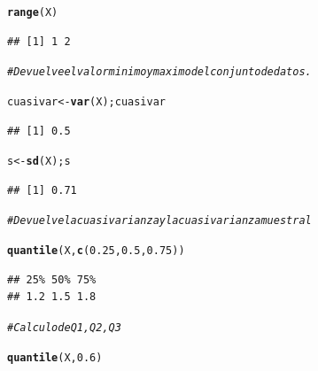 \documentclass[12pt,letterpaper]{article}\usepackage[]{graphicx}\usepackage[]{color}
\makeatletter
\newcommand{\hlnum}[1]{\textcolor[rgb]{0.686,0.059,0.569}{#1}}%
\newcommand{\hlcom}[1]{\textcolor[rgb]{0.678,0.584,0.686}{\textit{#1}}}%
\newcommand{\hlstd}[1]{\textcolor[rgb]{0.345,0.345,0.345}{#1}}%
\newcommand{\hlkwb}[1]{\textcolor[rgb]{0.69,0.353,0.396}{#1}}%
\newcommand{\hlkwd}[1]{\textcolor[rgb]{0.737,0.353,0.396}{\textbf{#1}}}%
\newenvironment{kframe}{%
 \def\at@end@of@kframe{}%
 \ifinner\ifhmode%
  \def\at@end@of@kframe{\end{minipage}}%
  \begin{minipage}{\columnwidth}%
 \fi\fi%
 \def\FrameCommand##1{\hskip\@totalleftmargin \hskip-\fboxsep
 \colorbox{shadecolor}{##1}\hskip-\fboxsep
     \hskip-\linewidth \hskip-\@totalleftmargin \hskip\columnwidth}%
 \MakeFramed {\advance\hsize-\width
   \@totalleftmargin\z@ \linewidth\hsize
   \@setminipage}}%
 {\par\unskip\endMakeFramed%
 \at@end@of@kframe}
\newenvironment{knitrout}{}{} %
\makeatother
\begin{document}
\begin{enumerate}
\begin{knitrout}
\begin{kframe}
\begin{alltt}
\hlkwd{range}\hlstd{(X)}
\end{alltt}
\begin{verbatim}
## [1] 1 2
\end{verbatim}
\begin{alltt}
\hlcom{# Devuelve el valor minimo y maximo del conjunto de datos. }
\end{alltt}
\end{kframe}
\end{knitrout}
\begin{knitrout}
\color{fgcolor}\begin{kframe}
\begin{alltt}
\hlstd{cuasivar} \hlkwb{<-} \hlkwd{var}\hlstd{(X); cuasivar}
\end{alltt}
\begin{verbatim}
## [1] 0.5
\end{verbatim}
\begin{alltt}
\hlstd{s} \hlkwb{<-} \hlkwd{sd}\hlstd{(X); s}
\end{alltt}
\begin{verbatim}
## [1] 0.71
\end{verbatim}
\begin{alltt}
\hlcom{# Devuelve la cuasivarianza y la cuasivarianza muestral }
\end{alltt}
\end{kframe}
\end{knitrout}
\begin{knitrout}
\color{fgcolor}\begin{kframe}
\begin{alltt}
\hlkwd{quantile}\hlstd{(X,}\hlkwd{c}\hlstd{(}\hlnum{0.25}\hlstd{,} \hlnum{0.5}\hlstd{,} \hlnum{0.75}\hlstd{))}
\end{alltt}
\begin{verbatim}
## 25% 50% 75% 
## 1.2 1.5 1.8
\end{verbatim}
\begin{alltt}
\hlcom{# Calculo de Q1, Q2, Q3 }
\end{alltt}
\end{kframe}
\end{knitrout}
\begin{knitrout}
\color{fgcolor}\begin{kframe}
\begin{alltt}
\hlkwd{quantile}\hlstd{(X,} \hlnum{0.6}\hlstd{)}
\end{alltt}

\end{kframe}
\end{knitrout}
\end{enumerate}
\end{document}
